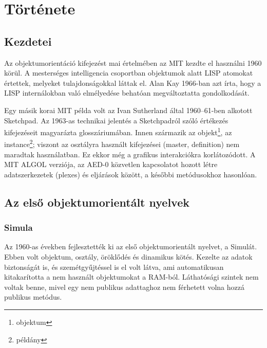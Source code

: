\documentclass[]{thesis-ekf}
\theoremstyle{definition}
\begin{document}
	\chapter{Története}\label{fejezet-tort}
	
	\section{Kezdetei}
	
	Az objektumorientáció kifejezést mai értelmében az MIT kezdte el használni 1960 körül. A mesterséges intelligencia csoportban objektumok alatt LISP atomokat értettek, melyeket tulajdonságokkal láttak el. Alan Kay 1966-ban azt írta, hogy a LISP internálokban való elmélyedése behatóan megváltoztatta gondolkodását.
	
	Egy másik korai MIT példa volt az Ivan Sutherland által 1960–61-ben alkotott Sketchpad. Az 1963-as technikai jelentés a Sketchpadról szóló értékezés kifejezéseit magyarázta glosszáriumában. Innen származik az objekt\footnote{objektum}, az instance\footnote{példány}; viszont az osztályra használt kifejezései (master, definition) nem maradtak használatban. Ez ekkor még a grafikus interakciókra korlátozódott. A MIT ALGOL verziója, az AED-0 közvetlen kapcsolatot hozott létre adatszerkezetek (plexes) és eljárások között, a későbbi metódusokhoz hasonlóan.
	
	\section{Az első objektumorientált nyelvek}
	\subsection{Simula}
	
	Az 1960-as években fejlesztették ki az első objektumorientált nyelvet, a Simulát. Ebben volt objektum, osztály, öröklődés és dinamikus kötés. Kezelte az adatok biztonságát is, és szemétgyűjtéssel is el volt látva, ami automatikusan kitakarította a nem használt objektumokat a RAM-ból. Láthatósági szintek nem voltak benne, mivel egy nem publikus adattaghoz nem férhetett volna hozzá publikus metódus.
	
\end{document}
